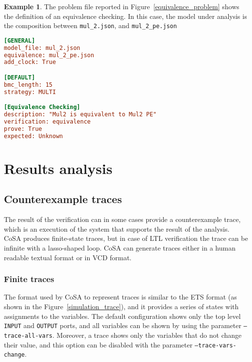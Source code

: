 \documentclass{article}
\theoremstyle{definition}
\newtheorem{example}{Example}[section]
\begin{document}
\begin{example}
The problem file reported in Figure~\ref{equivalence_problem} shows
the definition of an equivalence checking. In this case, the model
under analysis is the composition between \texttt{mul\_2.json}, and
\texttt{mul\_2\_pe.json}
  
\begin{lstlisting}[frame=single,language=Ini,caption=Problem file in \texttt{examples/mul\_2/problem\_1.txt},label=equivalence_problem]
[GENERAL]
model_file: mul_2.json
equivalence: mul_2_pe.json
add_clock: True

[DEFAULT]
bmc_length: 15
strategy: MULTI

[Equivalence Checking]
description: "Mul2 is equivalent to Mul2 PE"
verification: equivalence
prove: True
expected: Unknown
\end{lstlisting}
\end{example}

\section{Results analysis}
\label{sec:results_analysis}

\subsection{Counterexample traces}

The result of the verification can in some cases provide a
counterexample trace, which is an execution of the system that
supports the result of the analysis. CoSA produces finite-state
traces, but in case of LTL verification the trace can be infinite with
a lasso-shaped loop. CoSA can generate traces either in a human
readable textual format or in VCD format.



\subsubsection{Finite traces}

The format used by CoSA to represent traces is similar to the ETS
format (as shown in the Figure~\ref{simulation_trace}), and it
provides a series of states with assignments to the variables. The
default configuration shows only the top level \texttt{INPUT} and
\texttt{OUTPUT} ports, and all variables can be shown by using the
parameter \texttt{--trace-all-vars}. Moreover, a trace shows only the
variables that do not change their value, and this option can be
disabled with the parameter \texttt{--trace-vars-change}.
\end{document}
